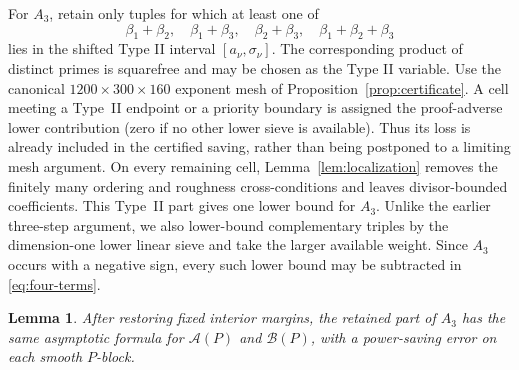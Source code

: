 \documentclass[10pt,reqno]{amsart}
\newcommand{\Acal}{\mathcal{A}}
\newcommand{\Bcal}{\mathcal{B}}
\newcommand{\1}{\mathbf{1}}
\theoremstyle{plain}
\newtheorem{lemma}[theorem]{Lemma}
\theoremstyle{remark}
\begin{document}
For $A_3$, retain only tuples for which at least one of
\begin{equation}\label{eq:subset-sums}
 \beta_1+\beta_2,\quad \beta_1+\beta_3,\quad
 \beta_2+\beta_3,\quad \beta_1+\beta_2+\beta_3
\end{equation}
lies in the shifted Type II interval $[a_\nu,\sigma_\nu]$.  The
corresponding product of
distinct primes is squarefree and may be chosen as the Type II variable.
Use the canonical $1200\times300\times160$ exponent mesh of
Proposition~\ref{prop:certificate}.  A cell meeting a Type~II endpoint or a
priority boundary is assigned the proof-adverse lower contribution (zero if
no other lower sieve is available).  Thus its loss is already included in
the certified saving, rather than being postponed to a limiting mesh
argument.  On every remaining cell,
Lemma~\ref{lem:localization} removes the finitely many ordering and
roughness cross-conditions and leaves divisor-bounded coefficients.  This
Type~II part gives one lower bound for $A_3$.  Unlike the earlier
three-step argument, we also
lower-bound complementary triples by the dimension-one lower linear sieve
and take the larger available weight.  Since $A_3$ occurs with a negative
sign, every such lower bound may be subtracted in \eqref{eq:four-terms}.

\begin{lemma}\label{lem:A3-transfer}
After restoring fixed interior margins, the retained part of $A_3$ has the
same asymptotic formula for $\Acal(P)$ and $\Bcal(P)$, with a power-saving
error on each smooth $P$-block.
\end{lemma}
\end{document}
